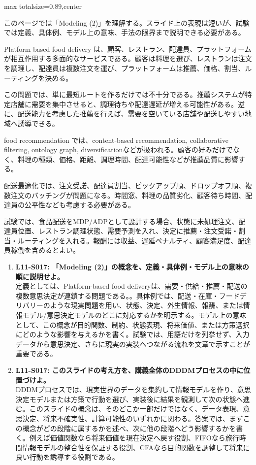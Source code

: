 \begin{minipage}[t]{0.58\textwidth}
\begin{adjustbox}{max totalsize={\textwidth}{0.89\textheight},center}
\begin{minipage}{\textwidth}\scriptsize
{}このページでは「Modeling (2)」を理解する。スライド上の表現は短いが、試験では定義、具体例、モデル上の意味、手法の限界まで説明できる必要がある。\par
Platform-based food delivery は、顧客、レストラン、配達員、プラットフォームが相互作用する多面的なサービスである。顧客は料理を選び、レストランは注文を調理し、配達員は複数注文を運び、プラットフォームは推薦、価格、割当、ルーティングを決める。\par
この問題では、単に最短ルートを作るだけでは不十分である。推薦システムが特定店舗に需要を集中させると、調理待ちや配達遅延が増える可能性がある。逆に、配送能力を考慮した推薦を行えば、需要を空いている店舗や配送しやすい地域へ誘導できる。\par
food recommendation では、content-based recommendation, collaborative filtering, ontology graph, diversificationなどが扱われる。顧客の好みだけでなく、料理の種類、価格、距離、調理時間、配達可能性などが推薦品質に影響する。\par
配送最適化では、注文受諾、配達員割当、ピックアップ順、ドロップオフ順、複数注文のバッチングが問題になる。時間窓、料理の品質劣化、顧客待ち時間、配達員の公平性なども考慮する必要がある。\par
試験では、食品配送をMDP/ADPとして設計する場合、状態に未処理注文、配達員位置、レストラン調理状態、需要予測を入れ、決定に推薦・注文受諾・割当・ルーティングを入れる。報酬には収益、遅延ペナルティ、顧客満足度、配達員稼働を含めるとよい。\par{}\begin{enumerate}\item \textbf{L11-S017: 「Modeling (2)」の概念を、定義・具体例・モデル上の意味の順に説明せよ。}\\定義としては、Platform-based food deliveryは、需要・供給・推薦・配送の複数意思決定が連鎖する問題である。。具体例では、配送・在庫・フードデリバリーのような現実問題を用い、状態、決定、外生情報、報酬、または情報モデル/意思決定モデルのどこに対応するかを明示する。モデル上の意味として、この概念が目的関数、制約、状態表現、将来価値、または方策選択にどのような影響を与えるかを書く。試験では、用語だけを列挙せず、入力データから意思決定、さらに現実の実装へつながる流れを文章で示すことが重要である。\item \textbf{L11-S017: このスライドの考え方を、講義全体のDDDMプロセスの中に位置づけよ。}\\DDDMプロセスでは、現実世界のデータを集約して情報モデルを作り、意思決定モデルまたは方策で行動を選び、実装後に結果を観測して次の状態へ進む。このスライドの概念は、そのどこか一部だけではなく、データ表現、意思決定、将来不確実性、計算可能性のいずれかに関わる。答案では、まずこの概念がどの段階に属するかを述べ、次に他の段階へどう影響するかを書く。例えば価値関数なら将来価値を現在決定へ戻す役割、FIFOなら旅行時間情報モデルの整合性を保証する役割、CFAなら目的関数を調整して将来に良い行動を誘導する役割である。\end{enumerate}

\end{minipage}
\end{adjustbox}
\end{minipage}
